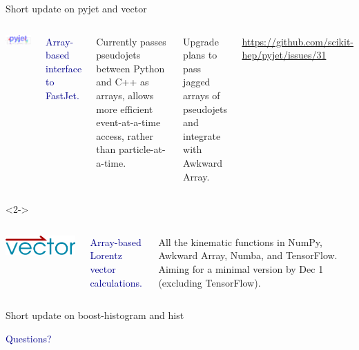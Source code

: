 \documentclass[aspectratio=169]{beamer}
\begin{document}
\begin{frame}{Short update on pyjet and vector}
\large
\vspace{0.5 cm}
\begin{columns}
\hfill \includegraphics[width=0.9\linewidth]{logo-pyjet.pdf}

\textcolor{darkblue}{\Large Array-based interface to FastJet.}

\vspace{0.25 cm}
Currently passes pseudojets between Python and C++ as arrays, allows more efficient event-at-a-time access, rather than particle-at-a-time.

\vspace{0.25 cm}
Upgrade plans to pass jagged arrays of pseudojets and integrate with Awkward Array.

\textcolor{blue}{\small \url{https://github.com/scikit-hep/pyjet/issues/31}}

\end{columns}

\vspace{0.75 cm}
\begin{uncoverenv}<2->
\begin{columns}
\hfill \includegraphics[width=0.9\linewidth]{logo-vector.pdf}

\textcolor{darkblue}{\Large Array-based Lorentz vector calculations.}

\vspace{0.25 cm}
All the kinematic functions in NumPy, Awkward Array, Numba, and TensorFlow. Aiming for a minimal version by Dec 1 (excluding TensorFlow).

\end{columns}
\end{uncoverenv}
\end{frame}

\begin{frame}{Short update on boost-histogram and hist}





\end{frame}

\begin{frame}{}
\Huge
\vspace{1 cm}
\begin{center}
\textcolor{darkblue}{Questions?}
\end{center}
\end{frame}
\end{document}
